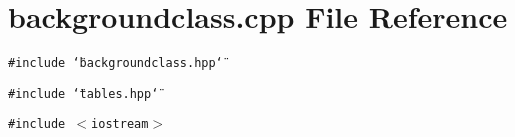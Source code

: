 \section{backgroundclass.cpp File Reference}
\label{backgroundclass_8cpp}
{\tt \#include \char`\"{}backgroundclass.hpp\char`\"{}}\par
{\tt \#include \char`\"{}tables.hpp\char`\"{}}\par
{\tt \#include $<$iostream$>$}\par
